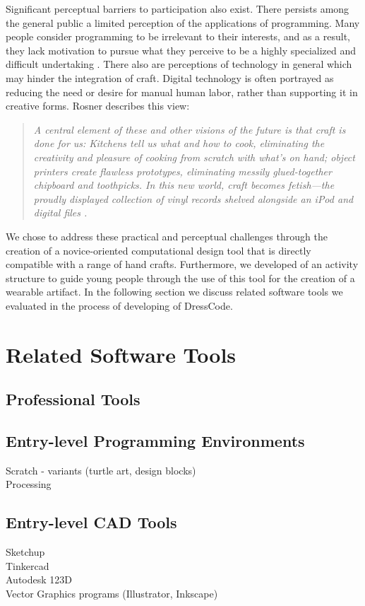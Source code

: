 \documentclass{sigchi}
\begin{document}
Significant perceptual barriers to participation also exist. There persists among the general public a limited perception of the applications of programming. Many people consider programming to be irrelevant to their interests, and as a result, they lack motivation to pursue what they perceive to be a highly specialized and difficult undertaking \cite{resnick1}. There also are perceptions of technology in general which may hinder the integration of craft. Digital technology is often portrayed as reducing the need or desire for manual human labor, rather than supporting it in creative forms. Rosner describes this view:

\begin{quotation}
 \textit{A central element of these and other visions of the future is that craft is done for us: Kitchens tell us what and how to cook, eliminating the creativity and pleasure of cooking from scratch with what's on hand; object printers create flawless prototypes, eliminating messily glued-together chipboard and toothpicks. In this new world, craft becomes fetish---the proudly displayed collection of vinyl records shelved alongside an iPod and digital files \cite{rosner_craft_vs_design}.}
\end{quotation}

We chose to address these practical and perceptual challenges through the creation of a novice-oriented computational design tool that is directly compatible with a range of hand crafts. Furthermore, we developed of an activity structure to guide young people through the use of this tool for the creation of a wearable artifact. In the following section we discuss related software tools we evaluated in the process of developing of DressCode.

\section{Related Software Tools}
\subsection{Professional Tools}
\subsection{Entry-level Programming Environments}
Scratch - variants (turtle art, design blocks) \\
Processing \\
\subsection{Entry-level CAD Tools}
Sketchup\\
Tinkercad\\
Autodesk 123D\\
Vector Graphics programs (Illustrator, Inkscape)\\
\end{document}
